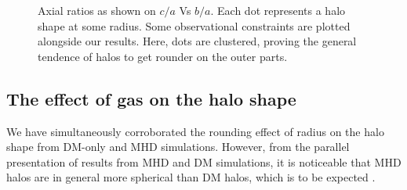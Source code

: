 \begin{figure}[!ht]
  \centering
  \hfill
  \hfill
  \caption{Axial ratios as shown on $c/a$ Vs $b/a$. Each dot represents a halo shape at some radius. Some observational constraints are plotted alongside our results. Here, dots are clustered, proving the general tendence of halos to get rounder on the outer parts. }
  \label{fig:Triaxiality_Inner_Outer}
\end{figure}


\subsection{The effect of gas on the halo shape}
We have simultaneously corroborated the rounding effect of radius on the halo shape from DM-only and MHD simulations. However, from the parallel presentation of results from MHD and DM simulations, it is noticeable that MHD halos are in general more spherical than DM halos, which is to be expected \cite{Barnes_and_Hernquist_1996,Springel_et_al._2004,Bryan_et_al._2013}.\\

